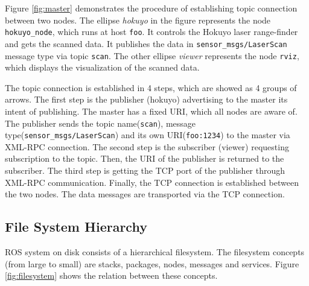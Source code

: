 \documentclass[a4paper, 10pt, conference]{ieeeconf}       %
\begin{document}
Figure \ref{fig:master} demonstrates the procedure of establishing topic connection between two nodes. The ellipse \emph{hokuyo} in the figure represents the node \texttt{hokuyo\_node}, which runs at host \texttt{foo}. It controls the Hokuyo laser range-finder and gets the scanned data. It publishes the data in \texttt{sensor\_msgs/LaserScan} message type via topic \texttt{scan}. The other ellipse \emph{viewer} represents the node \texttt{rviz}, which displays the visualization of the scanned data.

The topic connection is established in 4 steps, which are showed as 4 groups of arrows. The first step is the publisher (hokuyo) advertising to the master its intent of publishing. The master has a fixed URI, which all nodes are aware of. The publisher sends the topic name(\texttt{scan}), message type(\texttt{sensor\_msgs/LaserScan}) and its own URI(\texttt{foo:1234}) to the master via XML-RPC connection. The second step is the subscriber (viewer) requesting subscription to the topic. Then, the URI of the publisher is returned to the subscriber. The third step is getting the TCP port of the publisher through XML-RPC communication. Finally, the TCP connection is established between the two nodes. The data messages are transported via the TCP connection.

\subsection{File System Hierarchy}

ROS system on disk consists of a hierarchical filesystem. The filesystem concepts (from large to small) are stacks, packages, nodes, messages and services. Figure \ref{fig:filesystem} shows the relation between these concepts.
\end{document}
